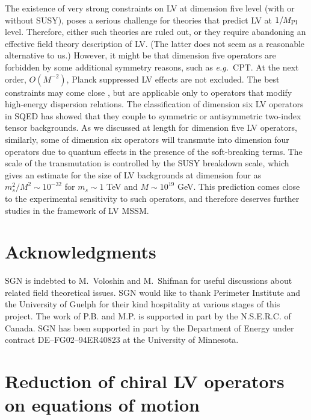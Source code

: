 \documentclass[12pt]{revtex4}
\begin{document}
The existence of very strong constraints on LV at dimension five level
(with or without SUSY), poses a serious challenge for theories that
predict LV at $1/M_{\rm Pl}$ level. Therefore, either such theories are
ruled out, or they require abandoning an effective field theory
description of LV. (The latter does not seem as a reasonable alternative
to us.) However, it might be that dimension five operators are
forbidden by some additional symmetry reasons, such as {\em e.g.}\
CPT. At the next order, $O(M^{-2})$, Planck suppressed LV effects 
are not excluded. The best constraints may come close
\cite{Gagnon:2004xh},  but are applicable only to operators that
modify high-energy dispersion relations. The classification of
dimension six LV operators in SQED has showed that they  couple to
symmetric or antisymmetric two-index tensor backgrounds. 
As we discussed at length for dimension five LV operators, similarly,  some
of dimension six operators will transmute into dimension four operators
due to quantum effects in the presence of the soft-breaking
terms. The scale of the transmutation is controlled by the
SUSY breakdown scale, which gives an estimate for the size of  
LV backgrounds at dimension four as $m_s^2/M^2 \sim 10^{-32}$
for $m_s\sim1$ TeV and $M\sim 10^{19}$ GeV. This prediction 
comes close to the experimental sensitivity to such operators,
and therefore deserves further studies in the framework of LV MSSM. 



\section*{Acknowledgments}


SGN is indebted to M.\ Voloshin and M.\ Shifman for useful discussions
about related field theoretical issues. 
SGN would like to thank Perimeter Institute and the University of
Guelph for their kind hospitality at various stages of this project. 
The work of P.B. and M.P. is supported in part by the N.S.E.R.C. of Canada. SGN has been supported in part by the Department of Energy 
under contract DE--FG02--94ER40823 at the University of Minnesota.



\pagebreak
\appendix


\section{Reduction of chiral LV operators on equations of motion}
\label{app_reduction}
\end{document}
